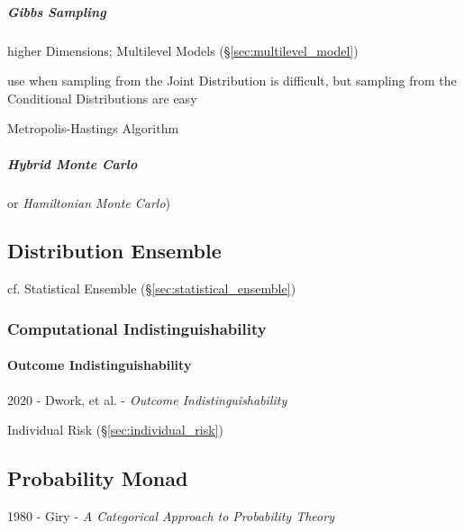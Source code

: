 \subparagraph{Gibbs Sampling}\label{sec:gibbs_sampling}\hfill

higher Dimensions; Multilevel Models (\S\ref{sec:multilevel_model})

use when sampling from the Joint Distribution is difficult, but sampling from
the Conditional Distributions are easy

Metropolis-Hastings Algorithm



\subparagraph{Hybrid Monte Carlo}\label{sec:hybrid_monte_carlo}\hfill

or \emph{Hamiltonian Monte Carlo})



\subsection{Distribution Ensemble}\label{sec:distribution_ensemble}

cf. Statistical Ensemble (\S\ref{sec:statistical_ensemble})



\subsubsection{Computational Indistinguishability}
\label{sec:indistinguishability}

\paragraph{Outcome Indistinguishability}
\label{sec:outcome_indistinguishability}\hfill

2020 - Dwork, et al. - \emph{Outcome Indistinguishability}

\fist Individual Risk (\S\ref{sec:individual_risk})



\subsection{Probability Monad}\label{sec:probability_monad}

1980 - Giry - \emph{A Categorical Approach to Probability Theory}

